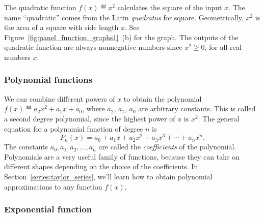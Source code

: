 			The quadratic function $f(x) \eqdef x^2$ calculates the square of the input $x$.
			The name ``quadratic'' comes from the Latin \emph{quadratus} for square.
			Geometrically,
			$x^2$ is the area of a square with side length $x$.
			See Figure~\ref{fig:panel_function_graphs1}~(b) for the graph.
			The outputs of the quadratic function are always nonnegative numbers
			since $x^2 \geq 0$, for all real numbers $x$.



		\subsubsection{Polynomial functions}

			We can combine different powers of $x$
			to obtain the polynomial $f(x) \eqdef a_2x^2 + a_1x + a_0$,
			where $a_2$, $a_1$, $a_0$ are arbitrary constants.
			This is called a second degree polynomial,
			since the highest power of $x$ is $x^2$.
			The general equation for a polynomial function of degree $n$ is
			\[
				P_n(x) = a_0 + a_1x + a_2x^2 + a_3x^3 + \cdots + a_nx^n.
			\]
			The constants $a_0,a_1,a_2,\ldots, a_n$ are called the \emph{coefficients} of the polynomial.
			Polynomials are a very useful family of functions,
			because they can take on different shapes depending on the choice of the coefficients.
			In Section~\ref{series:taylor_series},
			we'll learn how to obtain polynomial approximations to any function $f(x)$.








		\subsubsection{Exponential function}

